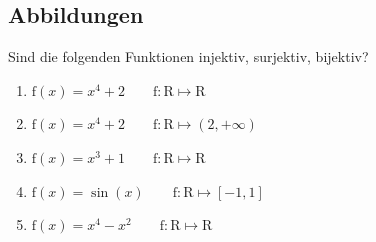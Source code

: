 \documentclass[11pt, a4paper]{article}
\newcommand\braces[1]{\left(#1\right)}
\newcommand\brackets[1]{\left[#1\right]}
\newif\ifshowsolution
\begin{document}
\subsection{Abbildungen}
Sind die folgenden Funktionen injektiv, surjektiv, bijektiv?
\begin{enumerate}
	\item $\mathrm{f}(x) = x^4+2 \qquad \mathrm{f}: \mathrm{R} \mapsto \mathrm{R}$
	
	\ifshowsolution
		nicht injektiv: $\mathrm{f}(1) = \mathrm{f}(-1)$ \\
		nicht surjektiv: $\forall x: \mathrm{f}(x) \geq 2$. Alternativ: $\nexists x: \mathrm{f}(x) = 0$ \\
		Somit ist f nicht bijektiv.
	\fi
	
	\item $\mathrm{f}(x) = x^4+2 \qquad \mathrm{f}: \mathrm{R} \mapsto (2, + \infty)$
	\ifshowsolution
		nicht injektiv: $\mathrm{f}(1) = \mathrm{f}(-1)$ \\
		surjektiv: $\mathrm{f}(x) = x^4 + 2 \Leftrightarrow \sqrt[4]{\mathrm{f}(x) - 2} = x$ \\
		$\sqrt[4]{\mathrm{f(x)}-2}$ existiert eindeutig für $x \geq 2$ (und somit auch für $x > 0$) \\
		Somit ist f nicht bijektiv.
	\fi
	
	\item $\mathrm{f}(x) = x^3+1 \qquad \mathrm{f}: \mathrm{R} \mapsto \mathrm{R}$
	
	\ifshowsolution
		injektiv: $x^3 + 1 = y^3 + 1 \Rightarrow x^3 = y^3 \Rightarrow x = y$ (Technischer: $\nexists x \neq y: x^3 + 1 \neq x^3 + 1$) \\
		surjektiv: $\forall y \in \mathrm{R}: \exists x \in \mathrm{R}: y = x^3 + 1 \Leftrightarrow y - 1 = x^3 \Leftrightarrow \sqrt[3]{y-1} = x$
		Somist ist f bijektiv.
	\fi
	
	\item $\mathrm{f}(x) = \sin(x) \qquad \mathrm{f}: \mathrm{R} \mapsto [-1, 1]$
	
	\ifshowsolution
		nicht injektiv: $\sin(\pi) = \sin(2 \pi)$ \\
		surjektiv: $\sin \braces{-\frac{\pi}{2}} = -1$, $\sin \braces{\frac{\pi}{2}} = 1$ und $\sin(x)$ steigt auf dem stetigen Intervall $\brackets{-\frac{\pi}{2},-\frac{\pi}{2}}$ monoton. \\
		Somit ist f nicht bijektiv.
	\fi
	
	\item $\mathrm{f}(x) = x^4 - x^2 \qquad \mathrm{f}: \mathrm{R} \mapsto \mathrm{R}$
	

\end{enumerate}
\end{document}
